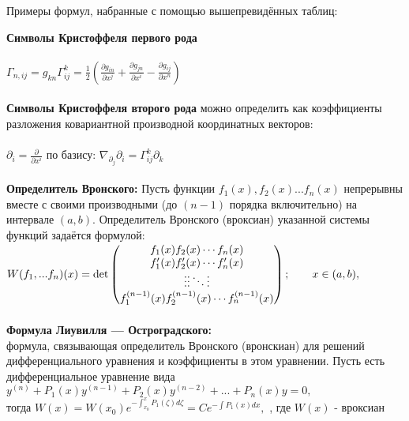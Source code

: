 \documentclass[a4paper,14pt,russian]{extreport}
\newcommand{\toCenter}[1]{\begin{center}#1\par\end{center}}
\begin{document}
\toCenter{Примеры формул, набранные с помощью вышепревидённых таблиц:}
\textbf{Символы Кристоффеля первого рода} \\ \\
$\Gamma_{n,ij}=g_{kn}\Gamma^{k}_{ij}=\frac{1}{2}\left(\frac{\partial g_{in}}{\partial x^j}+\frac{\partial g_{jn}}{\partial x^i}-\frac{\partial g_{ij}}{\partial x^n}\right)$\\ \\
\textbf{Символы Кристоффеля второго рода}  можно определить как коэффициенты разложения ковариантной производной координатных векторов:\\ \\
$\partial_i=\frac{\partial }{\partial x^i}$ по базису: $\nabla_{\partial_j}\partial_i = \Gamma^{k}_{ij}\partial_k$\\ \\
\textbf{Определитель Вронского:}
Пусть функции $f_1(x),f_2(x)...f_n(x)$ непрерывны вместе с своими производными (до $(n-1)$ порядка включительно) на интервале $(a,b)$. Определитель Вронского (вроксиан) указанной системы функций задаётся формулой: 
$\\ \\
W(f_1,... f_n)(x)
=\det\begin{pmatrix} f_1(x)  f_2(x) \cdots  f_n(x) \\
f'_1(x)  f'_2(x)  \cdots  f'_n(x) \\
\vdots  \vdots  \ddots  \vdots \\
f_1^{(n-1)}(x)  f_2^{(n-1)}(x)  \cdots  f_n^{(n-1)}(x) 
\end{pmatrix};\qquad x\in (a,b),
$
\\ \\
\textbf{Формула Лиувилля — Остроградского:}\\
формула, связывающая определитель Вронского (вронскиан) для решений дифференциального уравнения и коэффициенты в этом уравнении.
Пусть есть дифференциальное уравнение вида \\
$y^{(n)}+P_1(x)y^{(n-1)}+P_2(x)y^{(n-2)}+...+P_n(x)y=0,$ \\
тогда $W(x)=W(x_0)e^{-\int_{x_0}^x P_1(\zeta)d\zeta}=Ce^{-\int P_1(x)dx},$ , где $W(x)$ - вроксиан
\end{document}
